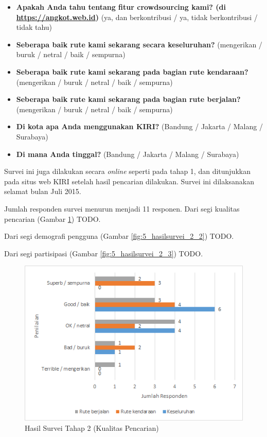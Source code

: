 \begin{itemize}
	\item \textbf{Apakah Anda tahu tentang fitur crowdsourcing kami? (di \url{https://angkot.web.id})} (ya, dan berkontribusi / ya, tidak berkontribusi / tidak tahu)
	\item \textbf{Seberapa baik rute kami sekarang secara keseluruhan?} (mengerikan / buruk / netral / baik / sempurna)
	\item \textbf{Seberapa baik rute kami sekarang pada bagian rute kendaraan?} (mengerikan / buruk / netral / baik / sempurna)
	\item \textbf{Seberapa baik rute kami sekarang pada bagian rute berjalan?} (mengerikan / buruk / netral / baik / sempurna)
	\item \textbf{Di kota apa Anda menggunakan KIRI?} (Bandung / Jakarta / Malang / Surabaya)
	\item \textbf{Di mana Anda tinggal?} (Bandung / Jakarta / Malang / Surabaya)
\end{itemize}

Survei ini juga dilakukan secara \textit{online} seperti pada tahap 1, dan ditunjukkan pada situs web KIRI setelah hasil pencarian dilakukan. Survei ini dilaksanakan selamat bulan Juli 2015.

Jumlah responden survei menurun menjadi 11 responen. Dari segi kualitas pencarian (Gambar \ref{fig:5_hasilsurvei_2_1}) TODO.

Dari segi demografi pengguna (Gambar \ref{fig:5_hasilsurvei_2_2}) TODO.

Dari segi partisipasi (Gambar \ref{fig:5_hasilsurvei_2_3}) TODO.

\begin{figure}
	\centering
	\includegraphics[scale=0.75]{Gambar/5_hasilsurvei_2_1}
	\caption{Hasil Survei Tahap 2 (Kualitas Pencarian)} 
	\label{fig:5_hasilsurvei_2_1}
\end{figure}

